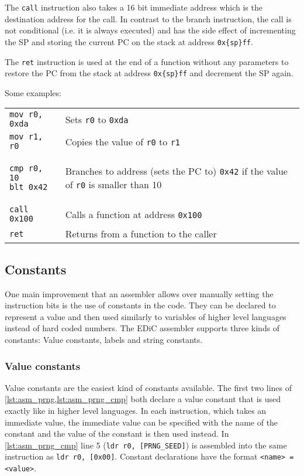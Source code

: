 The \texttt{call} instruction also takes a 16 bit immediate address which is the destination address for the call.
In contrast to the branch instruction, the call is not conditional (i.e. it is always executed) and has the side effect of incrementing the \gls{SP} and storing the current \gls{PC} on the stack at address \texttt{0x\{sp\}ff}.

The \texttt{ret} instruction is used at the end of a function without any parameters to restore the \gls{PC} from the stack at address \texttt{0x\{sp\}ff} and decrement the \gls{SP} again.

Some examples:

\begin{tabular}{m{}m{}}
  \texttt{mov r0, 0xda} & Sets \texttt{r0} to \texttt{0xda}                                                                       \\
  \texttt{mov r1, r0}   & Copies the value of \texttt{r0} to \texttt{r1}                                                          \\
  \begin{verbatim}
cmp r0, 10
blt 0x42
  \end{verbatim}
                                 & Branches to address (sets the \gls{PC} to) \texttt{0x42} if the value of \texttt{r0} is smaller than 10 \\
  \texttt{call 0x100}   & Calls a function at address \texttt{0x100}                                                              \\
  \texttt{ret}          & Returns from a function to the caller
\end{tabular}

\subsection{Constants}\label{sec:constants}
One main improvement that an assembler allows over manually setting the instruction bits is the use of constants in the code.
They can be declared to represent a value and then used similarly to variables of higher level languages instead of hard coded numbers.
The \gls{EDiC} assembler supports three kinds of constants: Value constants, labels and string constants.
\subsubsection{Value constants}\label{sec:vconstants}
Value constants are the easiest kind of constants available.
The first two lines of \cref{lst:asm_prng,lst:asm_prng_cmp} both declare a value constant that is used exactly like in higher level languages.
In each instruction, which takes an immediate value, the immediate value can be specified with the name of the constant and the value of the constant is then used instead.
In \cref{lst:asm_prng_cmp} line 5 (\texttt{ldr r0, [PRNG_SEED]}) is assembled into the same instruction as \texttt{ldr r0, [0x00]}.
Constant declarations have the format \texttt{<name> = <value>}.

